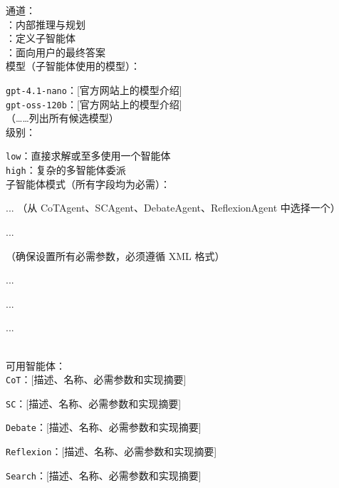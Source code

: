 \begin{developprompt}[title={开发提示词}]
通道：\\
    ：内部推理与规划 \\
    ：定义子智能体 \\
    ：面向用户的最终答案 \\

模型（子智能体使用的模型）：

    \texttt{gpt-4.1-nano}：[官方网站上的模型介绍] \\
    \texttt{gpt-oss-120b}：[官方网站上的模型介绍] \\
    （……列出所有候选模型）\\

\masness 级别：

    \texttt{low}：直接求解或至多使用一个智能体 \\
    \texttt{high}：复杂的多智能体委派\\

子智能体模式（所有字段均为必需）：\\


\quad{}
...
（从 CoTAgent、SCAgent、DebateAgent、ReflexionAgent 中选择一个）

\quad{}
...

\quad{}
（确保设置所有必需参数，必须遵循 XML 格式）

\qquad{}...

\qquad{}...

\quad{}

\quad{}
...

 \\

可用智能体：\\

\texttt{CoT}：[描述、名称、必需参数和实现摘要]

\texttt{SC}：[描述、名称、必需参数和实现摘要]

\texttt{Debate}：[描述、名称、必需参数和实现摘要]

\texttt{Reflexion}：[描述、名称、必需参数和实现摘要]

\texttt{Search}：[描述、名称、必需参数和实现摘要]


\end{developprompt}


